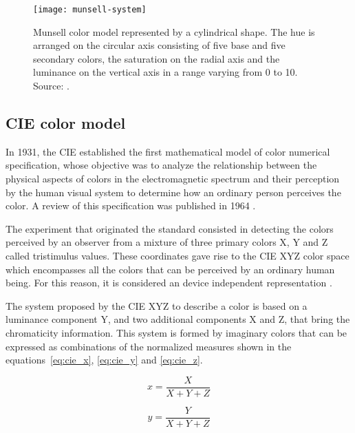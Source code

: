 \begin{figure}[!ht]
  \centering
  \texttt{[image: munsell-system]}
  \caption[Munsell color model.]{Munsell color model represented by a cylindrical shape. The hue is arranged on the circular axis consisting of five base and five secondary colors, the saturation on the radial axis and the luminance on the vertical axis in a range varying from 0 to 10. Source: \citet{rus:07}.}
  \label{fig:munsell-system} 
\end{figure}

\subsection{CIE color model}
\label{sec:modelo_cores_cie}

In 1931, the CIE established the first mathematical model of color numerical specification, whose objective was to analyze the relationship between the physical aspects of colors in the electromagnetic spectrum and their perception by the human visual system to determine how an ordinary person perceives the color. A review of this specification was published in 1964 \citep{gonzalez:02}.

The experiment that originated the standard consisted in detecting the colors perceived by an observer from a mixture of three primary colors X, Y and Z called tristimulus values. These coordinates gave rise to the CIE XYZ color space which encompasses all the colors that can be perceived by an ordinary human being. For this reason, it is considered an device independent representation \citep{konstantinos:00}.

The system proposed by the CIE XYZ to describe a color is based on a luminance component Y, and two additional components X and Z, that bring the chromaticity information. This system is formed by imaginary colors that can be expressed as combinations of the normalized measures shown in the equations~\ref{eq:cie_x}, \ref{eq:cie_y} and \ref{eq:cie_z}.

\begin{equation}
  x = \frac{X}{X + Y + Z}
\label{eq:cie_x}
\end{equation}

\begin{equation}
  y = \frac{Y}{X + Y + Z}
\label{eq:cie_y}
\end{equation}

